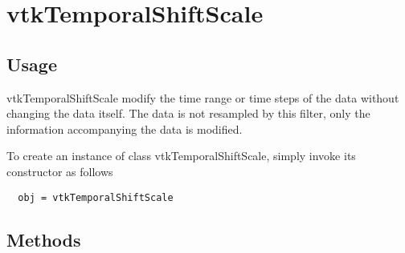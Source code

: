 \section{vtkTemporalShiftScale}

\subsection{Usage}

 vtkTemporalShiftScale  modify the time range or time steps of
 the data without changing the data itself. The data is not resampled
 by this filter, only the information accompanying the data is modified.

To create an instance of class vtkTemporalShiftScale, simply
invoke its constructor as follows
\begin{verbatim}
  obj = vtkTemporalShiftScale
\end{verbatim}
\subsection{Methods}

